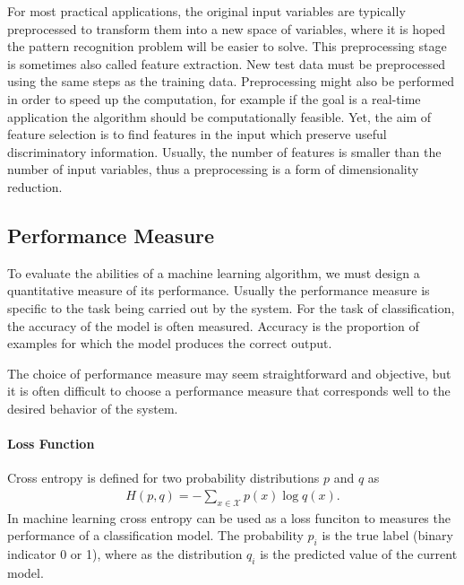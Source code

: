 \documentclass{scrartcl}
\begin{document}
For most practical applications, the original input variables are typically preprocessed to transform them into a new space of variables, where it is hoped the pattern recognition problem will be easier to solve. This preprocessing stage is sometimes also called feature extraction. New test data must be preprocessed using the same steps as the training data. Preprocessing might also be performed in order to speed up the computation, for example if the goal is a real-time application the algorithm should be computationally feasible. Yet, the aim of feature selection is to find features in the input which preserve useful discriminatory information. Usually, the number of features is smaller than the number of input variables, thus a preprocessing is a form of dimensionality reduction. 




\subsection{Performance Measure}

To evaluate the abilities of a machine learning algorithm, we must design a quantitative measure of its performance. Usually the performance measure is specific to the task being carried out by the system. For the task of classification, the accuracy of the model is often measured. Accuracy is the proportion of examples for which the model produces the correct output. 

The choice of performance measure may seem straightforward and objective, but it is often difficult to choose a performance measure that corresponds well to the desired behavior of the system. 

\paragraph{Loss Function}
Cross entropy is defined for two probability distributions $p$ and $q$ as
\begin{align}
H(p,q) = - \sum_{x \in \mathcal X} p(x) \log q(x).
\end{align} 
In machine learning cross entropy can be used as a loss funciton to measures the performance of a classification model. The probability $p_{i}$ is the true label (binary indicator 0 or 1), where as the distribution $q_{i}$ is the predicted value of the current model. 
\end{document}
